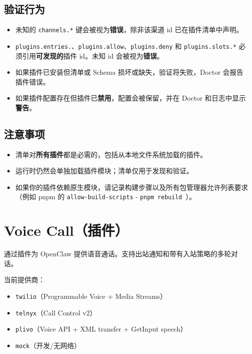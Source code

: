\subsection{验证行为}


\begin{itemize}
  \item 未知的 \texttt{channels.*} 键会被视为\textbf{错误}，除非该渠道 id 已在插件清单中声明。
  \item \texttt{plugins.entries.}、\texttt{plugins.allow}、\texttt{plugins.deny} 和 \texttt{plugins.slots.*} 必须引用\textbf{可发现的}插件 id。未知 id 会被视为\textbf{错误}。
  \item 如果插件已安装但清单或 Schema 损坏或缺失，验证将失败，Doctor 会报告插件错误。
  \item 如果插件配置存在但插件已\textbf{禁用}，配置会被保留，并在 Doctor 和日志中显示\textbf{警告}。
\end{itemize}


\subsection{注意事项}


\begin{itemize}
  \item 清单对\textbf{所有插件}都是必需的，包括从本地文件系统加载的插件。
  \item 运行时仍然会单独加载插件模块；清单仅用于发现和验证。
  \item 如果你的插件依赖原生模块，请记录构建步骤以及所有包管理器允许列表要求（例如 pnpm 的 \texttt{allow-build-scripts} - \texttt{pnpm rebuild }）。
\end{itemize}



\clearpage

\section{Voice Call（插件）}


通过插件为 OpenClaw 提供语音通话。支持出站通知和带有入站策略的多轮对话。

当前提供商：

\begin{itemize}
  \item \texttt{twilio}（Programmable Voice + Media Streams）
  \item \texttt{telnyx}（Call Control v2）
  \item \texttt{plivo}（Voice API + XML transfer + GetInput speech）
  \item \texttt{mock}（开发/无网络）
\end{itemize}


